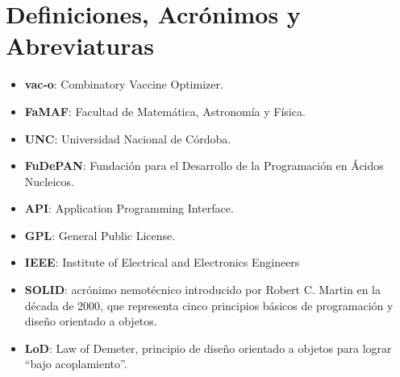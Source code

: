 \section{Definiciones, Acr\'onimos y Abreviaturas}
  \label{appendix-def}
  \begin{itemize}
    \item \textbf{vac-o}: Combinatory Vaccine Optimizer.
    \item \textbf{FaMAF}: Facultad de Matem\'atica, Astronom\'ia y F\'isica.
    \item \textbf{UNC}: Universidad Nacional de C\'ordoba.
    \item \textbf{FuDePAN}: Fundaci\'on para el Desarrollo de la Programaci\'on en \'Acidos Nucleicos.
    \item \textbf{API}: Application Programming Interface.
    \item \textbf{GPL}: General Public License.
    \item \textbf{IEEE}: Institute of Electrical and Electronics Engineers
    \item \textbf{SOLID}: acr\'onimo nemot\'ecnico introducido por Robert C. Martin en la d\'ecada de 2000, que representa cinco principios b\'asicos de programaci\'on y dise\~no orientado a objetos.
    \item \textbf{LoD}: Law of Demeter, principio de dise\~no orientado a objetos para lograr ``bajo acoplamiento''.    
    \end{itemize}
